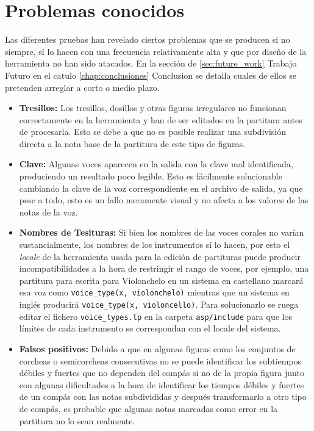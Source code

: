  \section{Problemas conocidos}
  \label{sec:known_issues}
  Las diferentes pruebas han revelado ciertos problemas que se producen si no siempre, sí lo hacen con una frecuencia relativamente alta y que por diseño de la herramienta no han sido atacados. En la sección de \ref{sec:future_work} Trabajo Futuro en el catulo \ref{chap:conclusiones} Conclusion se detalla cuales de ellos se pretenden arreglar a corto o medio plazo.
  
  \begin{itemize}
  		\item \textbf{Tresillos:} Los tresillos, dosillos y otras figuras irregulares no funcionan correctamente en la herramienta y han de ser editados en la partitura antes de procesarla. Esto se debe a que no es posible realizar una subdivisión directa a la nota base de la partitura de este tipo de figuras.
  		\item \textbf{Clave:} Algunas voces aparecen en la salida con la clave mal identificada, produciendo un resultado poco legible. Esto es fácilmente solucionable cambiando la clave de la voz correspondiente en el archivo de salida, ya que pese a todo, esto es un fallo meramente visual y no afecta a los valores de las notas de la voz.
  		\item \textbf{Nombres de Tesituras:} Si bien los nombres de las voces corales no varían sustancialmente, los nombres de los instrumentos sí lo hacen, por esto el \textit{locale} de la herramienta usada para la edición de partituras puede producir incompatibilidades a la hora de restringir el rango de voces, por ejemplo, una partitura para escrita para Violonchelo en un sistema en castellano marcará esa voz como \texttt{voice\_type(x, violonchelo)} mientras que un sistema en inglés producirá  \texttt{voice\_type(x, violoncello)}. Para solucionarlo se ruega editar el fichero \texttt{voice\_types.lp} en la carpeta \texttt{asp/include} para que los límites de cada instrumento se correspondan con el locale del sistema.
  		\item \textbf{Falsos positivos:} Debido a que en algunas figuras como los conjuntos de corcheas o semicorcheas consecutivas no se puede identificar los subtiempos débiles y fuertes que no dependen del compás si no de la propia figura junto con algunas dificultades a la hora de identificar los tiempos débiles y fuertes de un compás con las notas subdivididas y después transformarlo a otro tipo de compás, es probable que algunas notas marcadas como error en la partitura no lo sean realmente.
  \end{itemize}
  

